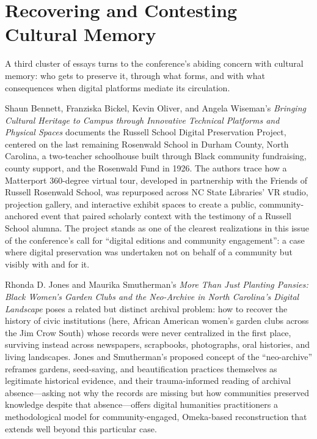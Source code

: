 \documentclass[final]{anthology-ch}  %
\begin{document}
\section{Recovering and Contesting Cultural Memory}

A third cluster of essays turns to the conference's abiding concern with cultural memory: who gets to preserve it, through what forms, and with what consequences when digital platforms mediate its circulation.

Shaun Bennett, Franziska Bickel, Kevin Oliver, and Angela Wiseman's \textit{Bringing Cultural Heritage to Campus through Innovative Technical Platforms and Physical Spaces} documents the Russell School Digital Preservation Project, centered on the last remaining Rosenwald School in Durham County, North Carolina, a two-teacher schoolhouse built through Black community fundraising, county support, and the Rosenwald Fund in 1926. The authors trace how a Matterport 360-degree virtual tour, developed in partnership with the Friends of Russell Rosenwald School, was repurposed across NC State Libraries' VR studio, projection gallery, and interactive exhibit spaces to create a public, community-anchored event that paired scholarly context with the testimony of a Russell School alumna. The project stands as one of the clearest realizations in this issue of the conference's call for \enquote{digital editions and community engagement}: a case where digital preservation was undertaken not on behalf of a community but visibly with and for it.

Rhonda D. Jones and Maurika Smutherman's \textit{More Than Just Planting Pansies: Black Women's Garden Clubs and the Neo-Archive in North Carolina's Digital Landscape} poses a related but distinct archival problem: how to recover the history of civic institutions (here, African American women's garden clubs across the Jim Crow South) whose records were never centralized in the first place, surviving instead across newspapers, scrapbooks, photographs, oral histories, and living landscapes. Jones and Smutherman's proposed concept of the \enquote{neo-archive} reframes gardens, seed-saving, and beautification practices themselves as legitimate historical evidence, and their trauma-informed reading of archival absence---asking not why the records are missing but how communities preserved knowledge despite that absence---offers digital humanities practitioners a methodological model for community-engaged, Omeka-based reconstruction that extends well beyond this particular case.
\end{document}
